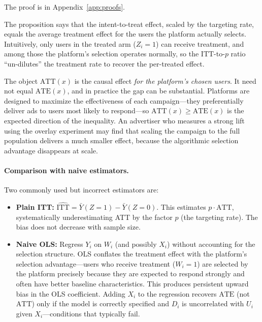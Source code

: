 \documentclass[12pt]{article}
\newcommand{\ATT}{\mathrm{ATT}}
\newcommand{\ATE}{\mathrm{ATE}}
\newcommand{\ITT}{\mathrm{ITT}}
\begin{document}
\noindent The proof is in Appendix~\ref{app:proofs}.

The proposition says that the intent-to-treat effect, scaled by the
targeting rate, equals the average treatment effect for the users the
platform actually selects. Intuitively, only users in the treated arm
($Z_i = 1$) can receive treatment, and among those the platform's selection
operates normally, so the $\ITT$-to-$p$ ratio ``un-dilutes'' the treatment
rate to recover the per-treated effect.

The object $\ATT(x)$ is the causal effect \emph{for the platform's chosen
users}. It need not equal $\ATE(x)$, and in practice the gap can be
substantial. Platforms are designed to maximize the effectiveness of each
campaign---they preferentially deliver ads to users most likely to
respond---so $\ATT(x) \geq \ATE(x)$ is the expected direction of the
inequality. An advertiser who measures a strong lift using the overlay
experiment may find that scaling the campaign to the full population
delivers a much smaller effect, because the algorithmic selection advantage
disappears at scale.

\paragraph{Comparison with naive estimators.} Two commonly used but
incorrect estimators are:
\begin{itemize}
  \item \textbf{Plain ITT:} $\hat{\ITT} = \bar{Y}(Z=1) - \bar{Y}(Z=0)$.
    This estimates $p \cdot \ATT$, systematically underestimating ATT
    by the factor $p$ (the targeting rate). The bias does not decrease
    with sample size.
  \item \textbf{Naive OLS:} Regress $Y_i$ on $W_i$ (and possibly $X_i$)
    without accounting for the selection structure. OLS conflates the
    treatment effect with the platform's selection advantage---users who
    receive treatment ($W_i=1$) are selected by the platform precisely
    because they are expected to respond strongly and often have better
    baseline characteristics. This produces persistent upward bias in
    the OLS coefficient. Adding $X_i$ to the regression recovers $\ATE$
    (not $\ATT$) only if the model is correctly specified and $D_i$ is
    uncorrelated with $U_i$ given $X_i$---conditions that typically fail.
\end{itemize}

\end{document}
